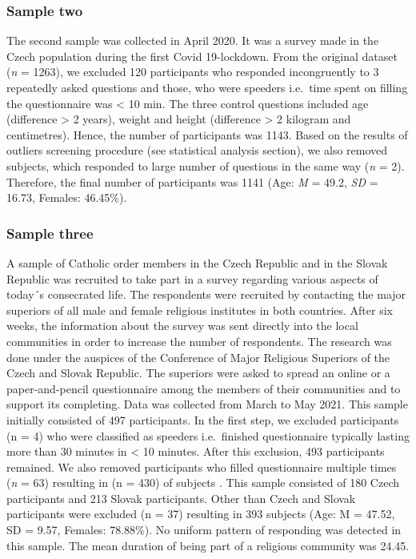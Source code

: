 \documentclass[ijerph,article,accept,moreauthors,pdftex]{mdpi}
\begin{document}
\hypertarget{sample-two}{%
\subsubsection{Sample two}\label{sample-two}}

The second sample was collected in April 2020. It was a survey made in
the Czech population during the first Covid 19-lockdown. From the
original dataset (\emph{n} = 1263), we excluded 120 participants who
responded incongruently to 3 repeatedly asked questions and those, who
were speeders i.e.~time spent on filling the questionnaire was
\textless{} 10 min. The three control questions included age (difference
\textgreater{} 2 years), weight and height (difference \textgreater{} 2
kilogram and centimetres). Hence, the number of participants was 1143.
Based on the results of outliers screening procedure (see statistical
analysis section), we also removed subjects, which responded to large
number of questions in the same way (\emph{n} = 2). Therefore, the final
number of participants was 1141 (Age: \emph{M} = 49.2, \emph{SD} =
16.73, Females: 46.45\%).

\hypertarget{sample-three}{%
\subsubsection{Sample three}\label{sample-three}}

A sample of Catholic order members in the Czech Republic and in the
Slovak Republic was recruited to take part in a survey regarding various
aspects of today´s consecrated life. The respondents were recruited by
contacting the major superiors of all male and female religious
institutes in both countries. After six weeks, the information about the
survey was sent directly into the local communities in order to increase
the number of respondents. The research was done under the auspices of
the Conference of Major Religious Superiors of the Czech and Slovak
Republic. The superiors were asked to spread an online or a
paper-and-pencil questionnaire among the members of their communities
and to support its completing. Data was collected from March to May
2021. This sample initially consisted of 497 participants. In the first
step, we excluded participants (n = 4) who were classified as speeders
i.e.~finished questionnaire typically lasting more than 30 minutes in
\textless{} 10 minutes. After this exclusion, 493 participants remained.
We also removed participants who filled questionnaire multiple times
(\emph{n} = 63) resulting in (n = 430) of subjects . This sample
consisted of 180 Czech participants and 213 Slovak participants. Other
than Czech and Slovak participants were excluded (n = 37) resulting in
393 subjects (Age: M = 47.52, SD = 9.57, Females: 78.88\%). No uniform
pattern of responding was detected in this sample. The mean duration of
being part of a religious community was 24.45.
\end{document}
